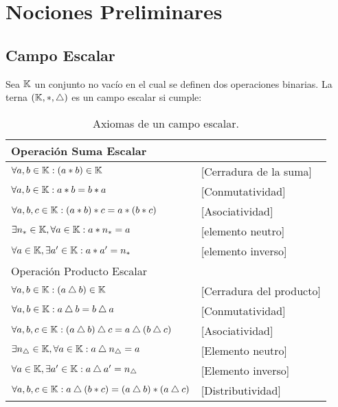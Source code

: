 \chapter{Nociones Preliminares}

\section{Campo Escalar}
Sea $\mathbb{K}$ un conjunto no vacío en el cual se definen dos operaciones binarias. La terna $\left( \mathbb{K},\ast,\bigtriangleup \right)$ es un campo escalar si cumple: 



\begin{table}[htbp]
\begin{center}
\begin{tabular}{|l|l|}
\hline
\multicolumn{2}{|l|}{Operación Suma Escalar } \\
\hline \hline
$\forall a,b\in \mathbb{K}: (a*b)\in \mathbb{K} $ &[Cerradura de la suma] \\ \hline
$ \forall  a,b\in \mathbb{K}: a*b=b*a $&[Conmutatividad]  \\ \hline
$\forall  a,b,c\in \mathbb{K}: (a*b)*c=a*(b*c)$&[Asociatividad] \\ 
\hline
$\exists n_* \in \mathbb{K}, \forall  a\in \mathbb{K}: a*n_*=a$&  [elemento neutro]  \\ \hline
$\forall  a\in \mathbb{K}, \exists a'\in \mathbb{K}: a*a'=n_*$&  [elemento inverso]  \\ \hline\hline 
\multicolumn{2}{|l|}{Operación Producto Escalar} \\ \hline \hline
 $\forall  a,b\in \mathbb{K}: (a\bigtriangleup b)\in \mathbb{K} $& [Cerradura del producto] \\ \hline
$\forall  a,b\in \mathbb{K}: a\bigtriangleup b=b\bigtriangleup a$&  [Conmutatividad]  \\ \hline
$\forall  a,b,c\in \mathbb{K}: (a\bigtriangleup b)\bigtriangleup c=a\bigtriangleup (b\bigtriangleup c) $&  [Asociatividad]  \\ \hline
$\exists n_\bigtriangleup \in \mathbb{K}, \forall  a\in \mathbb{K}:  a \bigtriangleup n_\bigtriangleup =a $&  [Elemento neutro]  \\ \hline
$\forall  a\in \mathbb{K}, \exists a' \in \mathbb{K}: a \bigtriangleup a'=n_\bigtriangleup  $&  [Elemento inverso]  \\ \hline \hline
$\forall a,b,c\in \mathbb{K}:  a\bigtriangleup (b*c)=(a\bigtriangleup b)*(a\bigtriangleup c)$ & [Distributividad]\\ \hline
\end{tabular}
\caption{Axiomas de un campo escalar.}
\label{tabla:sencilla}
\end{center}
\end{table}


